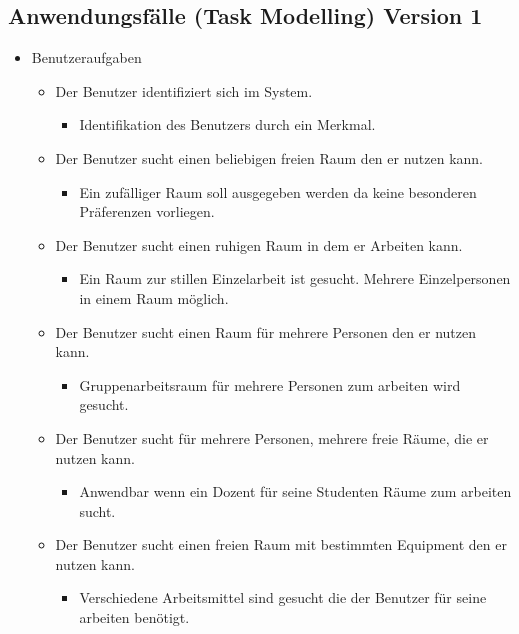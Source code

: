 
\subsection{Anwendungsfälle (Task Modelling) Version 1}
\label{anhang:Anwendungsfälle_Task_Modelling_v1}

\begin{itemize}
	\item Benutzeraufgaben
	\begin{itemize}[noitemsep]
		\item Der Benutzer identifiziert sich im System.
		\begin{itemize}
			\item Identifikation des Benutzers durch ein Merkmal.
		\end{itemize}
		\item Der Benutzer sucht einen beliebigen freien Raum den er nutzen kann.
		\begin{itemize}
			\item Ein zufälliger Raum soll ausgegeben werden da keine besonderen Präferenzen vorliegen.
		\end{itemize}
		\item Der Benutzer sucht einen ruhigen Raum in dem er Arbeiten kann.
		\begin{itemize}
			\item Ein Raum zur stillen Einzelarbeit ist gesucht. Mehrere Einzelpersonen in einem Raum möglich.
		\end{itemize}
		\item Der Benutzer sucht einen Raum für mehrere Personen den er nutzen kann.
		\begin{itemize}
			\item Gruppenarbeitsraum für mehrere Personen zum arbeiten wird gesucht.
		\end{itemize}
		\item Der Benutzer sucht für mehrere Personen, mehrere freie Räume, die er nutzen kann.
		\begin{itemize}
			\item Anwendbar wenn \zB ein Dozent für seine Studenten Räume zum arbeiten sucht.
		\end{itemize}
		\item Der Benutzer sucht einen freien Raum mit bestimmten Equipment den er nutzen kann.
		\begin{itemize}
			\item Verschiedene Arbeitsmittel sind gesucht die der Benutzer für seine arbeiten benötigt.

\end{itemize}
\end{itemize}
\end{itemize}
